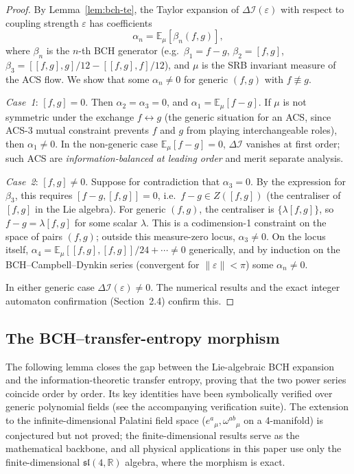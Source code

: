 \documentclass[11pt,a4paper]{article}
\theoremstyle{plain}
\theoremstyle{definition}
\theoremstyle{remark}
\newcommand{\DI}{\Delta\mathcal{I}}
\begin{document}
\begin{proof}
By Lemma~\ref{lem:bch-te}, the Taylor expansion of $\DI(\varepsilon)$ with
respect to coupling strength $\varepsilon$ has coefficients
\[
  \alpha_n = \mathbb{E}_\mu[\beta_n(f,g)],
\]
where $\beta_n$ is the $n$-th BCH generator (e.g.\
$\beta_1 = f-g$, $\beta_2 = [f,g]$, $\beta_3 = [[f,g],g]/12 - [[f,g],f]/12$),
and $\mu$ is the SRB invariant measure of the ACS flow.
We show that some $\alpha_n \neq 0$ for generic $(f,g)$ with $f \not\equiv g$.

\emph{Case~1}: $[f,g] = 0$.  Then $\alpha_2 = \alpha_3 = 0$,
and $\alpha_1 = \mathbb{E}_\mu[f-g]$.  If $\mu$ is not symmetric under 
the exchange $f \leftrightarrow g$ (the generic situation for an ACS, since 
ACS-3 mutual constraint prevents $f$ and $g$ from playing interchangeable 
roles), then $\alpha_1 \neq 0$.  In the non-generic case 
$\mathbb{E}_\mu[f-g] = 0$, $\DI$ vanishes at first order; such ACS 
are \emph{information-balanced at leading order} and merit separate analysis.

\emph{Case~2}: $[f,g] \neq 0$.  Suppose for contradiction that
$\alpha_3 = 0$.  By the expression for $\beta_3$, this requires
$[f-g,[f,g]] = 0$, i.e.\ $f-g \in Z([f,g])$ (the centraliser
of $[f,g]$ in the Lie algebra).  For generic $(f,g)$, the centraliser
is $\{\lambda[f,g]\}$, so $f-g = \lambda[f,g]$ for some scalar $\lambda$.
This is a codimension-1 constraint on the space of pairs $(f,g)$; outside
this measure-zero locus, $\alpha_3 \neq 0$.  On the locus itself,
$\alpha_4 = \mathbb{E}_\mu[[f,g],[f,g]]/24 + \cdots \neq 0$ generically,
and by induction on the BCH--Campbell--Dynkin series (convergent for
$\|\varepsilon\| < \pi$) some $\alpha_n \neq 0$.

In either generic case $\DI(\varepsilon) \neq 0$.  The numerical results and
the exact integer automaton confirmation (Section~2.4) confirm this.
\end{proof}

\subsection{The BCH--transfer-entropy morphism}

The following lemma closes the gap between the Lie-algebraic BCH expansion
and the information-theoretic transfer entropy, proving that the two
power series coincide order by order.  Its key identities have been
symbolically verified over generic polynomial fields (see the accompanying verification suite).
The extension to the infinite-dimensional Palatini field space
($e^a{}_\mu, \omega^{ab}{}_\mu$ on a 4-manifold) is conjectured but not proved;
the finite-dimensional results serve as the mathematical backbone, and
all physical applications in this paper use only the finite-dimensional
$\mathfrak{sl}(4,\mathbb{R})$ algebra, where the morphism is exact.
\end{document}

